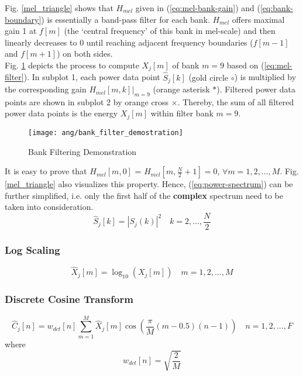 Fig. \ref{mel_triangle} shows that $H_{mel}$ given in (\ref{eq:mel-bank-gain}) and (\ref{eq:bank-boundary}) is essentially a band-pass filter for each bank. $H_{mel}$ offers maximal gain 1 at $f[m]$ (the `central frequency' of this bank in mel-scale) and then linearly decreases to 0 until reaching adjacent frequency boundaries ($f[m-1]$ and $f[m+1]$) on both sides.\\

Fig. \ref{bank_filter_demostration} depicts the process to compute $X_j[m]$ of bank $m = 9$ based on (\ref{eq:mel-filter}). In subplot 1, each power data point $\hat{S}_j[k]$ (\textcolor{gold_matlab}{gold circle $\circ$}) is multiplied by the corresponding gain $H_{mel}[m, k]|_{m=9}$ (\textcolor{orange_matlab}{orange asterisk $*$}). Filtered power data points are shown in subplot 2 by \textcolor{orange_matlab}{orange cross $\times$}. Thereby, the sum of all filtered power data points is the energy $X_j[m]$ within filter bank $m = 9$.

\begin{figure}[H]
\centering
\texttt{[image: ang/bank\_filter\_demostration]}
\caption{Bank Filtering Demonstration}
\label{bank_filter_demostration}
\end{figure}

It is easy to prove that $H_{mel}[m, 0]$ = $H_{mel}[m, \frac{N}{2}+1] = 0$, $\forall m = 1, 2, \dots, M$. Fig. \ref{mel_triangle} also visualizes this property. Hence, (\ref{eq:power-spectrum}) can be further simplified, i.e. only the first half of the \textbf{complex} spectrum need to be taken into consideration.
\begin{equation}
\hat{S}_j[k] = |S_j(k)|^2 \quad k = 2, \dots, \frac{N}{2}
\end{equation}


\subsubsection{Log Scaling}

\begin{equation}
\label{eq:log-scaling}
\hat{X}_j[m] = \log_{10}(X_j[m]) \quad m = 1, 2, \dots, M
\end{equation}


\subsubsection{Discrete Cosine Transform}

\begin{equation}
\label{eq:dct}
\hat{C}_j[n] = w_{dct}[n] \sum^{M}_{m=1} \hat{X}_j[m] \cos \left( \frac{\pi}{M} (m - 0.5) (n-1) \right) \quad n = 1, 2, \dots, F
\end{equation}
where
\begin{equation}
\label{eq:dct-weight}
w_{dct}[n] = \sqrt{\frac{2}{M}}
\end{equation}
